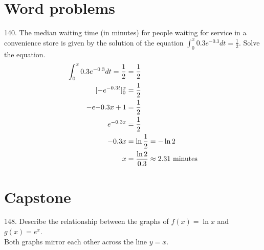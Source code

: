 \documentclass[11pt]{article}
\newcommand*{\set}{\setcounter{equation}{0}}
\newcommand*{\s}{\section}
\begin{document}
\s{Word problems}
140. The median waiting time (in minutes) for people
waiting for service in a convenience store is given by the
solution of the equation $\int_{0}^{x}0.3e^{-0.3}dt=\frac{1}{2}$. Solve the equation.
\begin{align}
    \set
    \int_{0}^{x}0.3e^{-0.3}dt=\frac{1}{2}&=\frac{1}{2}\\
    [-e^{-0.3t}]_0^x&=\frac{1}{2}\\
    -e{-0.3x}+1&=\frac{1}{2}\\
    e^{-0.3x}&=\frac{1}{2}\\
    -0.3x&=\ln\frac{1}{2}=-\ln 2\\
    x&=\frac{\ln 2}{0.3}\approx 2.31\text{ minutes}
\end{align}

\s{Capstone}
148. Describe the relationship between the graphs of $f(x)=\ln x$ and $g(x)=e^x$.\\
\indent Both graphs mirror each other across the line $y=x$.
\end{document}
